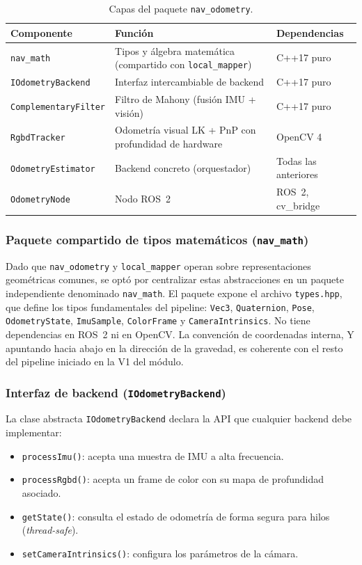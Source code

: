 \begin{table}[h]
\centering
\caption{Capas del paquete \texttt{nav\_odometry}.}
\label{tab:vio-capas}
\begin{tabularx}{\textwidth}{lXl}
\hline
\textbf{Componente} & \textbf{Función} & \textbf{Dependencias} \\
\hline
\texttt{nav\_math} & Tipos y álgebra matemática (compartido con \texttt{local\_mapper}) & C++17 puro \\
\texttt{IOdometryBackend} & Interfaz intercambiable de backend & C++17 puro \\
\texttt{ComplementaryFilter} & Filtro de Mahony (fusión IMU + visión) & C++17 puro \\
\texttt{RgbdTracker} & Odometría visual LK + PnP con profundidad de hardware & OpenCV 4 \\
\texttt{OdometryEstimator} & Backend concreto (orquestador) & Todas las anteriores \\
\texttt{OdometryNode} & Nodo ROS~2 & ROS~2, cv\_bridge \\
\hline
\end{tabularx}
\end{table}

\subsubsection{Paquete compartido de tipos matemáticos (\texttt{nav\_math})}

Dado que \texttt{nav\_odometry} y \texttt{local\_mapper} operan sobre
representaciones geométricas comunes, se optó por centralizar estas
abstracciones en un paquete independiente denominado \texttt{nav\_math}.
El paquete expone el archivo \texttt{types.hpp}, que define los tipos
fundamentales del pipeline: \texttt{Vec3}, \texttt{Quaternion},
\texttt{Pose}, \texttt{OdometryState}, \texttt{ImuSample}, \texttt{ColorFrame}
y \texttt{CameraIntrinsics}. No tiene dependencias en ROS~2 ni en OpenCV.
La convención de coordenadas interna, Y apuntando hacia abajo en la dirección
de la gravedad, es coherente con el resto del pipeline iniciado en la V1 del
módulo.

\subsubsection{Interfaz de backend (\texttt{IOdometryBackend})}

La clase abstracta \texttt{IOdometryBackend} declara la API que cualquier
backend debe implementar:
\begin{itemize}
  \item \texttt{processImu()}: acepta una muestra de IMU a alta frecuencia.
  \item \texttt{processRgbd()}: acepta un frame de color con su mapa de
    profundidad asociado.
  \item \texttt{getState()}: consulta el estado de odometría de forma
    segura para hilos (\emph{thread-safe}).
  \item \texttt{setCameraIntrinsics()}: configura los parámetros de la cámara.
\end{itemize}

